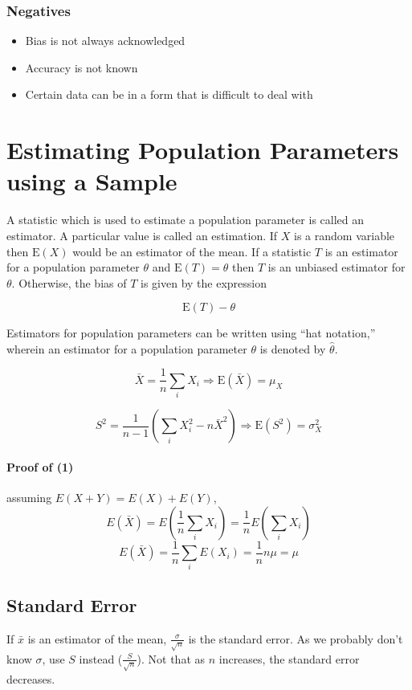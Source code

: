 \documentclass{article}
\begin{document}
\subsubsection{Negatives}

\begin{itemize}

    \item Bias is not always acknowledged
    \item Accuracy is not known
    \item Certain data can be in a form that is difficult to deal with

\end{itemize}

\section{Estimating Population Parameters using a Sample}

A statistic which is used to estimate a population parameter is called an estimator. A particular value is called an estimation. If $X$ is a random variable then $\textrm{E}(X)$ would be an estimator of the mean. If a statistic $T$ is an estimator for a population parameter $\theta$ and $\textrm{E}(T)=\theta$ then $T$ is an unbiased estimator for $\theta$. Otherwise, the bias of $T$ is given by the expression

\[\textrm{E}(T)-\theta\]

\noindent Estimators for population parameters can be written using ``hat notation,'' wherein an estimator for a population parameter $\theta$ is denoted by $\hat{\theta}$.

\begin{equation}\bar{X}=\frac{1}{n}\sum_iX_i\Rightarrow \textrm{E}(\bar{X})=\mu_X\end{equation}

\begin{equation}S^2=\frac{1}{n-1}\left(\sum_iX_i^2-n\bar{X}^2\right)\Rightarrow\textrm{E}(S^2)=\sigma_X^2\end{equation}

\paragraph{Proof of (1)} assuming $E(X+Y)=E(X)+E(Y)$,
\[E(\bar{X})=E\left(\frac{1}{n}\sum_iX_i\right)=\frac{1}{n}E\left(\sum_iX_i\right)\]
\[E(\bar{X})=\frac{1}{n}\sum_iE(X_i)=\frac{1}{n}n\mu=\mu\]

\subsection{Standard Error}

If $\bar{x}$ is an estimator of the mean, $\frac{\sigma}{\sqrt n}$ is the standard error. As we probably don't know $\sigma$, use $S$ instead ($\frac{S}{\sqrt n}$). Not that as $n$ increases, the standard error decreases.
\end{document}
